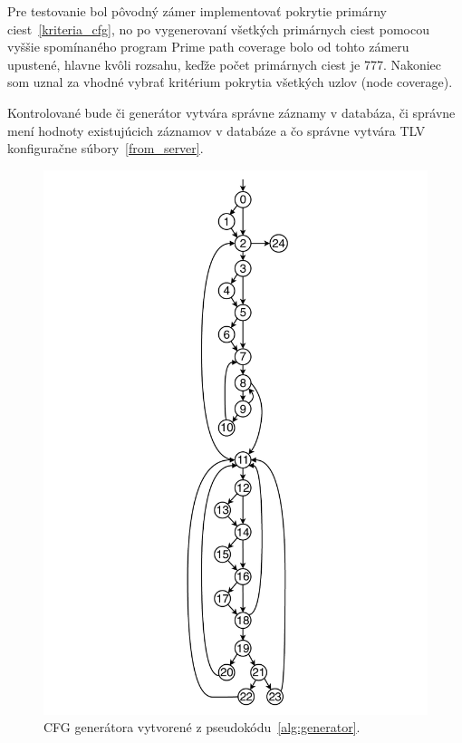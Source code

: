 Pre testovanie bol pôvodný zámer implementovať pokrytie primárny ciest~\ref{kriteria_cfg}, no po vygenerovaní všetkých primárnych ciest pomocou vyššie spomínaného program Prime path coverage bolo od tohto zámeru upustené, hlavne kvôli rozsahu, keďže počet primárnych ciest je 777.
Nakoniec som uznal za vhodné vybrať kritérium pokrytia všetkých uzlov (node coverage).

Kontrolované bude či generátor vytvára správne záznamy v databáza, či správne mení hodnoty existujúcich záznamov v databáze a čo správne vytvára TLV konfiguračne súbory~\ref{from_server}.

\begin{figure}[h]
	\centering
	\includegraphics[height=0.7\paperheight]{obrazky/cfg_generator.pdf}
	\caption{CFG generátora vytvorené z pseudokódu~\ref{alg:generator}.}
	\label{fig:cfg_gen}
\end{figure}


